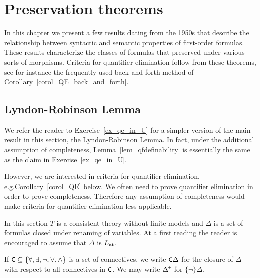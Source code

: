 \chapter{Preservation theorems}
\label{elimination}
\def\ceq#1#2#3{\noindent\smash{\parbox[t]{15ex}{$\displaystyle #1$}}\parbox{6ex}{\hfil $#2$}{$\displaystyle #3$}}


In this chapter we present a few results dating from the 1950s that describe the relationship between syntactic and semantic properties of first-order formulas. These results characterize the classes of formulas that preserved under various sorts of morphisms. Criteria for quantifier-elimination follow from these theorems, see for instance the frequently used back-and-forth method of Corollary~\ref{corol_QE_back_and_forth}.

\section{Lyndon-Robinson Lemma}
\label{TeoremidiPreservazione}


We refer the reader to Exercise~\ref{ex_qe_in_U} for a simpler version 
of the main result in this section, the Lyndon-Robinson Lemma. 
In fact, under the additional assumption of completeness, Lemma~\ref{lem_qfdefinability} 
is essentially the same as the claim in Exercise~\ref{ex_qe_in_U}.

However, we are interested in criteria for quantifier
elimination, e.g.\@ Corollary~\ref{corol_QE} below.
We often need to prove quantifier elimination in order to prove completeness.
Therefore any assumption of completeness would make criteria for quantifier elimination less applicable.

In this section $T$ is a consistent theory without finite models and $\Delta$ is a set of formulas closed under renaming of variables. 
At a first reading the reader is encouraged to assume that $\Delta$ is $L_{\rm at}$.

\begin{definition}\label{def_C_Delta}
If $\textsf{\small C}\subseteq\{\forall,\exists,\neg,\vee,\wedge\}$ is a set of connectives, we write \emph{$\textsf{\small C}\Delta$} for the closure of $\Delta$ with respect to all connectives in $\textsf{\small C}$.
We may write $\pmDelta$ for $\{\neg\}\Delta$.\QED%
\end{definition}





